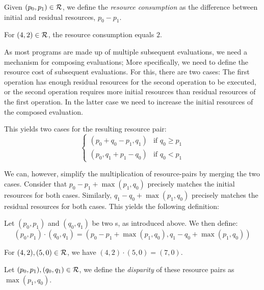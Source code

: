 \begin{definition}
   Given \((p_0, p_1) \in \mathcal{R}\), we define the \emph{resource consumption} as the difference between initial and residual resources, \(p_0 - p_1\).
\end{definition}

\begin{example}
   For \((4, 2) \in \mathcal{R}\), the resource consumption equals \(2\).
\end{example}

As most programs are made up of multiple subsequent evaluations, we need a mechanism for composing evaluations; More specifically, we need to define the resource cost of subsequent evaluations. 
For this, there are two cases: The first operation has enough residual resources for the second operation to be executed, or the second operation requires more initial resources than residual resources of the first operation. In the latter case we need to increase the initial resources of the composed evaluation.

This yields two cases for the resulting resource pair:
\[
   \begin{cases}
      (p_0 + q_0 - p_1,  q_1) & \mbox{if } q_0 \geq p_1 \\
      (p_0,q_1 + p_1 - q_0) & \mbox{if } q_0 <    p_1 
   \end{cases}
\]

We can, however, simplify the multiplication of resource-pairs by merging the two cases. Consider that \(p_0 - p_1 + \max(p_1, q_0)\) precisely matches the initial resources for both cases. Similarly, \(q_1 - q_0 + \max(p_1, q_0)\) precisely matches the residual resources for both cases. 
This yields the following definition:

\begin{definition}
   \label{def:multiplying-pairs}
   Let \((p_0, p_1)\) and \((q_0, q_1)\) be two s, as introduced above. We then define:
   \[(p_0, p_1) \cdot (q_0, q_1) = (p_0 - p_1 + \max(p_1, q_0), q_1 - q_0 + \max(p_1, q_0))\]
\end{definition}

\begin{example}
   For \((4, 2), (5,0) \in \mathcal{R}\), we have \((4, 2) \cdot (5, 0) = (7,0)\).
\end{example}

\begin{definition}
   Let \((p_0, p_1), (q_0, q_1) \in \mathcal{R}\), we define the \emph{disparity} of these resource pairs as \(\max(p_1, q_0)\).
\end{definition}

